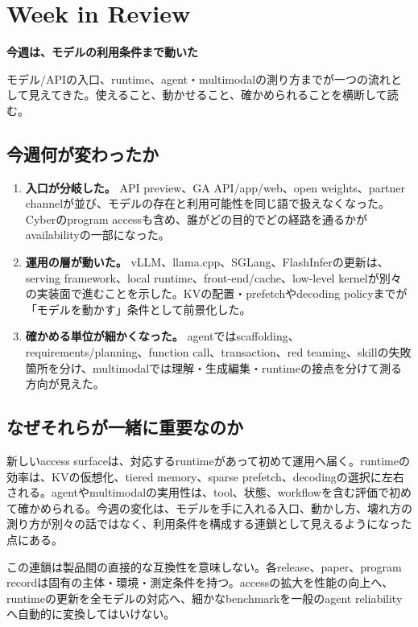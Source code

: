 \section{Week in Review}
\begin{wideflow}
{\Large\bfseries 今週は、モデルの利用条件まで動いた}\par
\smallskip
{\color{SurveyMuted}モデル/APIの入口、runtime、agent・multimodalの測り方までが一つの流れとして見えてきた。使えること、動かせること、確かめられることを横断して読む。}\par
\end{wideflow}

\subsection*{今週何が変わったか}
\begin{enumerate}[leftmargin=1.6em]
\item \textbf{入口が分岐した。} API preview、GA API/app/web、open weights、partner channelが並び、モデルの存在と利用可能性を同じ語で扱えなくなった。Cyberのprogram accessも含め、誰がどの目的でどの経路を通るかがavailabilityの一部になった。
\item \textbf{運用の層が動いた。} vLLM、llama.cpp、SGLang、FlashInferの更新は、serving framework、local runtime、front-end/cache、low-level kernelが別々の実装面で進むことを示した。KVの配置・prefetchやdecoding policyまでが「モデルを動かす」条件として前景化した。
\item \textbf{確かめる単位が細かくなった。} agentではscaffolding、requirements/planning、function call、transaction、red teaming、skillの失敗箇所を分け、multimodalでは理解・生成編集・runtimeの接点を分けて測る方向が見えた。
\end{enumerate}

\subsection*{なぜそれらが一緒に重要なのか}
新しいaccess surfaceは、対応するruntimeがあって初めて運用へ届く。runtimeの効率は、KVの仮想化、tiered memory、sparse prefetch、decodingの選択に左右される。agentやmultimodalの実用性は、tool、状態、workflowを含む評価で初めて確かめられる。今週の変化は、モデルを手に入れる入口、動かし方、壊れ方の測り方が別々の話ではなく、利用条件を構成する連鎖として見えるようになった点にある。

この連鎖は製品間の直接的な互換性を意味しない。各release、paper、program recordは固有の主体・環境・測定条件を持つ。accessの拡大を性能の向上へ、runtimeの更新を全モデルの対応へ、細かなbenchmarkを一般のagent reliabilityへ自動的に変換してはいけない。

